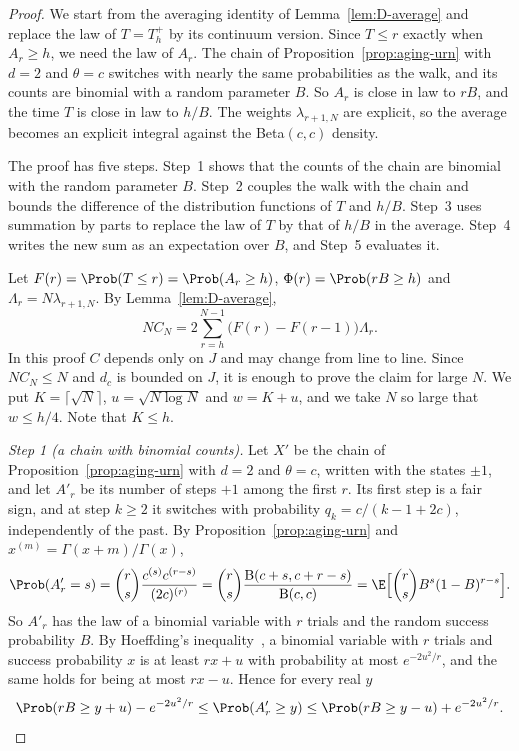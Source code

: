\begin{proof}
We start from the averaging identity of Lemma~\ref{lem:D-average} and replace
the law of $T=T^+_h$ by its continuum version. Since $T\le r$ exactly when
$A_r\ge h$, we need the law of $A_r$. The chain of
Proposition~\ref{prop:aging-urn} with $d=2$ and $\theta=c$ switches with
nearly the same probabilities as the walk, and its counts are binomial with a
random parameter $B$. So $A_r$ is close in law to $rB$, and the time $T$ is
close in law to $h/B$. The weights $\lambda_{r+1,N}$ are explicit, so the
average becomes an explicit integral against the Beta$(c,c)$ density.

The proof has five steps. Step~1 shows that the counts of the chain are
binomial with the random parameter $B$. Step~2 couples the walk with the chain
and bounds the difference of the distribution functions of $T$ and $h/B$. Step~3 uses
summation by parts to replace the law of $T$ by that of $h/B$ in the average.
Step~4 writes the new sum as an expectation over $B$, and Step~5 evaluates it.

Let $F(r)=\Prob(T\le r)=\Prob(A_r\ge h)$, $\Phi(r)=\Prob(rB\ge h)$ and
$\Lambda_r=N\lambda_{r+1,N}$. By Lemma~\ref{lem:D-average},
\[
NC_N=2\sum_{r=h}^{N-1}\bigl(F(r)-F(r-1)\bigr)\Lambda_r .
\]
In this proof $C$ depends only on $J$ and may change from line to line. Since
$NC_N\le N$ and $d_c$ is bounded on $J$, it is enough to prove the claim for
large $N$. We put $K=\lceil\sqrt N\rceil$, $u=\sqrt{N\log N}$ and $w=K+u$, and
we take $N$ so large that $w\le h/4$. Note that $K\le h$.

\emph{Step 1 (a chain with binomial counts).} Let $X'$ be the chain of
Proposition~\ref{prop:aging-urn} with $d=2$ and $\theta=c$, written with the
states $\pm1$, and let $A'_r$ be its number of steps $+1$ among the first $r$.
Its first step is a fair sign, and at step $k\ge2$ it switches with
probability $q_k=c/(k-1+2c)$, independently of the past. By
Proposition~\ref{prop:aging-urn} and $x^{(m)}=\Gamma(x+m)/\Gamma(x)$,
\[
\Prob(A'_r=s)=\binom rs\frac{c^{(s)}c^{(r-s)}}{(2c)^{(r)}}
=\binom rs\frac{\mathrm B(c+s,c+r-s)}{\mathrm B(c,c)}
=\E\Bigl[\binom rsB^s(1-B)^{r-s}\Bigr].
\]
So $A'_r$ has the law of a binomial variable with $r$ trials and the random
success probability $B$. By Hoeffding's inequality~\cite[Theorem~1]{hoeffding1963},
a binomial variable with $r$ trials and success probability $x$ is at least
$rx+u$ with probability at most $e^{-2u^2/r}$, and the same holds for being at
most $rx-u$. Hence for every real $y$
\[
\Prob(rB\ge y+u)-e^{-2u^2/r}\le\Prob(A'_r\ge y)\le\Prob(rB\ge y-u)+e^{-2u^2/r}.
\]


\end{proof}
